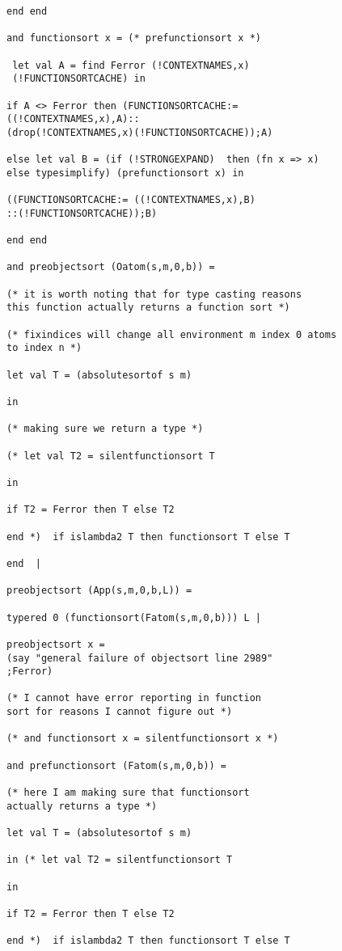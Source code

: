 \documentclass[12pt]{article}
\begin{document}
\begin{verbatim}
end end 

and functionsort x = (* prefunctionsort x *)

 let val A = find Ferror (!CONTEXTNAMES,x)
 (!FUNCTIONSORTCACHE) in

if A <> Ferror then (FUNCTIONSORTCACHE:= 
((!CONTEXTNAMES,x),A)::
(drop(!CONTEXTNAMES,x)(!FUNCTIONSORTCACHE));A)

else let val B = (if (!STRONGEXPAND)  then (fn x => x) 
else typesimplify) (prefunctionsort x) in

((FUNCTIONSORTCACHE:= ((!CONTEXTNAMES,x),B)
::(!FUNCTIONSORTCACHE));B)

end end 

and preobjectsort (Oatom(s,m,0,b)) =

(* it is worth noting that for type casting reasons
this function actually returns a function sort *)

(* fixindices will change all environment m index 0 atoms
to index n *)

let val T = (absolutesortof s m)

in

(* making sure we return a type *)

(* let val T2 = silentfunctionsort T

in

if T2 = Ferror then T else T2

end *)  if islambda2 T then functionsort T else T

end  |

preobjectsort (App(s,m,0,b,L)) =

typered 0 (functionsort(Fatom(s,m,0,b))) L |

preobjectsort x = 
(say "general failure of objectsort line 2989"
;Ferror)

(* I cannot have error reporting in function
sort for reasons I cannot figure out *)

(* and functionsort x = silentfunctionsort x *)

and prefunctionsort (Fatom(s,m,0,b)) = 

(* here I am making sure that functionsort
actually returns a type *)

let val T = (absolutesortof s m)

in (* let val T2 = silentfunctionsort T

in

if T2 = Ferror then T else T2

end *)  if islambda2 T then functionsort T else T


\end{verbatim}
\end{document}
